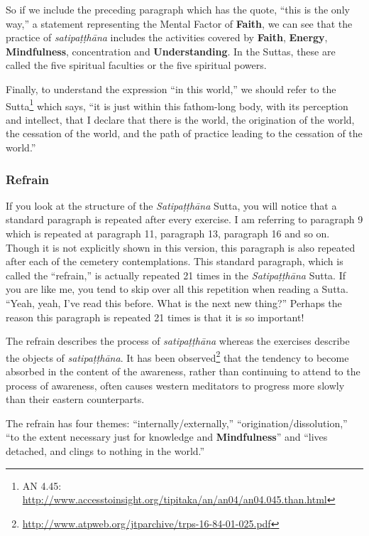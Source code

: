 So if we include the preceding paragraph which has the quote, “this is the only way,” a statement representing the Mental Factor of \textbf{Faith}, we can see that the practice of \textit{satipaṭṭhāna} includes the activities covered by \textbf{Faith}, \textbf{Energy}, \textbf{Mindfulness}, concentration and \textbf{Understanding}. In the Suttas, these are called the five spiritual faculties or the five spiritual powers.

Finally, to understand the expression “in this world,” we should refer to the Sutta\footnote{AN 4.45: \url{http://www.accesstoinsight.org/tipitaka/an/an04/an04.045.than.html}} which says, “it is just within this fathom-long body, with its perception and intellect, that I declare that there is the world, the origination of the world, the cessation of the world, and the path of practice leading to the cessation of the world.”

\subsubsection*{Refrain}

If you look at the structure of the \textit{Satipaṭṭhāna} Sutta, you will notice that a standard paragraph is repeated after every exercise. I am referring to paragraph 9 which is repeated at paragraph 11, paragraph 13, paragraph 16 and so on. Though it is not explicitly shown in this version, this paragraph is also repeated after each of the cemetery contemplations. This standard paragraph, which is called the “refrain,” is actually repeated 21 times in the \textit{Satipaṭṭhāna} Sutta. If you are like me, you tend to skip over all this repetition when reading a Sutta. “Yeah, yeah, I’ve read this before. What is the next new thing?” Perhaps the reason this paragraph is repeated 21 times is that it is so important!

The refrain describes the process of \textit{satipaṭṭhāna} whereas the exercises describe the objects of \textit{satipaṭṭhāna}. It has been observed\footnote{\url{http://www.atpweb.org/jtparchive/trps-16-84-01-025.pdf}} that the tendency to become absorbed in the content of the awareness, rather than continuing to attend to the process of awareness, often causes western meditators to progress more slowly than their eastern counterparts.

The refrain has four themes: “internally/externally,” “origination/dissolution,” “to the extent necessary just for knowledge and \textbf{Mindfulness}” and “lives detached, and clings to nothing in the world.”

